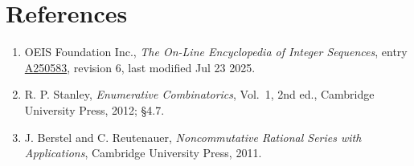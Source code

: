 \documentclass[11pt]{article}
\theoremstyle{definition}
\begin{document}
\section{References}

\begin{enumerate}

\item OEIS Foundation Inc., \emph{The On-Line Encyclopedia of Integer Sequences}, entry \href{https://oeis.org/A250583}{A250583}, revision 6, last modified Jul 23 2025.

\item R. P. Stanley, \emph{Enumerative Combinatorics}, Vol.~1, 2nd ed., Cambridge University Press, 2012; \S4.7.

\item J. Berstel and C. Reutenauer, \emph{Noncommutative Rational Series with Applications}, Cambridge University Press, 2011.

\end{enumerate}
\end{document}
